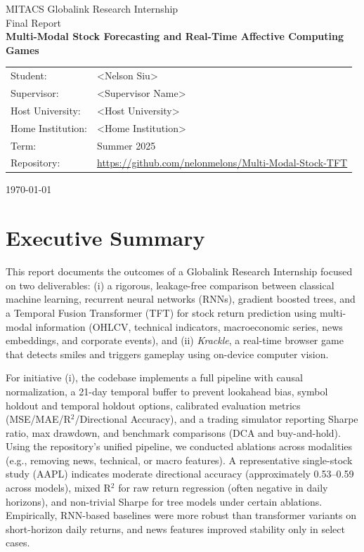 \documentclass[11pt]{article}
\newcommand{\projectTitle}{Multi-Modal Stock Forecasting and Real-Time Affective Computing Games}
\newcommand{\studentName}{<Nelson Siu>}
\newcommand{\supervisorName}{<Supervisor Name>}
\newcommand{\hostUniversity}{<Host University>}
\newcommand{\homeInstitution}{<Home Institution>}
\newcommand{\termStr}{Summer 2025}
\newcommand{\repoLink}{https://github.com/nelonmelons/Multi-Modal-Stock-TFT}
\begin{document}
\begin{titlepage}
  \centering
  \vspace*{2cm}
  {\Large MITACS Globalink Research Internship\\[4pt] Final Report\\}
  \vspace{2cm}
  {\huge \bfseries \projectTitle \\}
  \vspace{1.5cm}
  \begin{tabular}{ll}
    Student: & \studentName\\
    Supervisor: & \supervisorName\\
    Host University: & \hostUniversity\\
    Home Institution: & \homeInstitution\\
    Term: & \termStr\\
    Repository: & \href{\repoLink}{\repoLink}
  \end{tabular}
  \vfill
  {\large \today}
\end{titlepage}

\section*{Executive Summary}
This report documents the outcomes of a Globalink Research Internship focused on two deliverables: (i) a rigorous, leakage-free comparison between classical machine learning, recurrent neural networks (RNNs), gradient boosted trees, and a Temporal Fusion Transformer (TFT) for stock return prediction using multi-modal information (OHLCV, technical indicators, macroeconomic series, news embeddings, and corporate events), and (ii) \emph{Krackle}, a real-time browser game that detects smiles and triggers gameplay using on-device computer vision.

For initiative (i), the codebase implements a full pipeline with causal normalization, a 21-day temporal buffer to prevent lookahead bias, symbol holdout and temporal holdout options, calibrated evaluation metrics (MSE/MAE/R$^2$/Directional Accuracy), and a trading simulator reporting Sharpe ratio, max drawdown, and benchmark comparisons (DCA and buy-and-hold). Using the repository's unified pipeline, we conducted ablations across modalities (e.g., removing news, technical, or macro features). A representative single-stock study (AAPL) indicates moderate directional accuracy (approximately 0.53–0.59 across models), mixed R$^2$ for raw return regression (often negative in daily horizons), and non-trivial Sharpe for tree models under certain ablations. Empirically, RNN-based baselines were more robust than transformer variants on short-horizon daily returns, and news features improved stability only in select cases.
\end{document}
